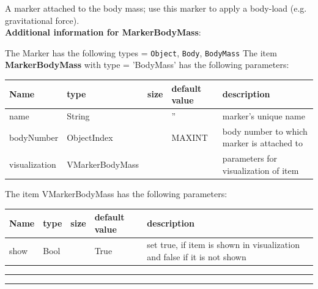\label{sec:item:MarkerBodyMass}
A marker attached to the body mass; use this marker to apply a body-load (e.g. gravitational force).\vspace{12pt}
 \\{\bf Additional information for MarkerBodyMass}:
\bi
  \item The Marker has the following types = \texttt{Object}, \texttt{Body}, \texttt{BodyMass}
\ei
\vspace{12pt} \noindent The item {\bf MarkerBodyMass} with type = 'BodyMass' has the following parameters:\vspace{-1cm}\\ 
\begin{center}
  \footnotesize
  \begin{longtable}{| p{4.5cm} | p{2.5cm} | p{0.5cm} | p{2.5cm} | p{6cm} |}
    \hline
    \bf Name & \bf type & \bf size & \bf default value & \bf description \\ \hline
    name &     String &      &     '' &     marker's unique name\\ \hline
    bodyNumber &     ObjectIndex &      &     MAXINT &     body number to which marker is attached to\\ \hline
    visualization & VMarkerBodyMass & & & parameters for visualization of item \\ \hline
	  \end{longtable}
	\end{center}
The item VMarkerBodyMass has the following parameters:\vspace{-1cm}\\ 
\begin{center}
  \footnotesize
  \begin{longtable}{| p{4.5cm} | p{2.5cm} | p{0.5cm} | p{2.5cm} | p{6cm} |}
    \hline
    \bf Name & \bf type & \bf size & \bf default value & \bf description \\ \hline
    show &     Bool &      &     True &     set true, if item is shown in visualization and false if it is not shown\\ \hline
	  \end{longtable}
	\end{center}
\par\noindent\rule{\textwidth}{0.4pt}
\label{description_MarkerBodyMass}
\vspace{6pt}\par\noindent\rule{\textwidth}{0.4pt}
